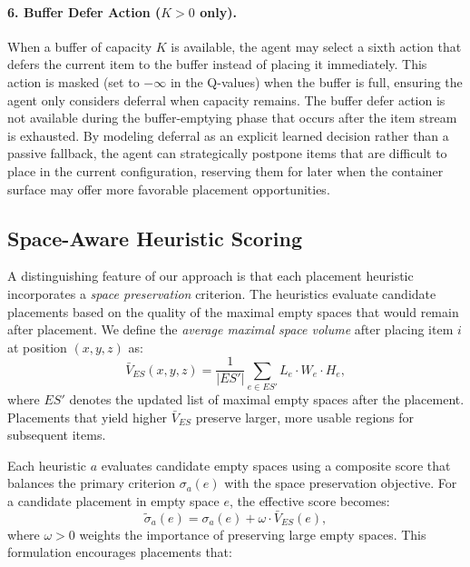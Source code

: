 \documentclass[runningheads]{llncs}
\begin{document}
\paragraph{6. Buffer Defer Action ($K > 0$ only).}
When a buffer of capacity $K$ is available, the agent may select a sixth action that defers the current item to the buffer instead of placing it immediately. This action is masked (set to $-\infty$ in the Q-values) when the buffer is full, ensuring the agent only considers deferral when capacity remains. The buffer defer action is not available during the buffer-emptying phase that occurs after the item stream is exhausted. By modeling deferral as an explicit learned decision rather than a passive fallback, the agent can strategically postpone items that are difficult to place in the current configuration, reserving them for later when the container surface may offer more favorable placement opportunities.

\subsection{Space-Aware Heuristic Scoring}
\label{sec:space_aware}

A distinguishing feature of our approach is that each placement heuristic incorporates a \emph{space preservation} criterion. The heuristics evaluate candidate placements based on the quality of the maximal empty spaces that would remain after placement. We define the \emph{average maximal space volume} after placing item $i$ at position $(x, y, z)$ as:
\begin{equation}
    \bar{V}_{ES}(x, y, z) = \frac{1}{|ES'|} \sum_{e \in ES'} L_e \cdot W_e \cdot H_e,
\end{equation}
where $ES'$ denotes the updated list of maximal empty spaces after the placement. Placements that yield higher $\bar{V}_{ES}$ preserve larger, more usable regions for subsequent items.

Each heuristic $a$ evaluates candidate empty spaces using a composite score that balances the primary criterion $\sigma_a(e)$ with the space preservation objective. For a candidate placement in empty space $e$, the effective score becomes:
\begin{equation}
    \tilde{\sigma}_a(e) = \sigma_a(e) + \omega \cdot \bar{V}_{ES}(e),
\end{equation}
where $\omega > 0$ weights the importance of preserving large empty spaces. This formulation encourages placements that:
\end{document}
